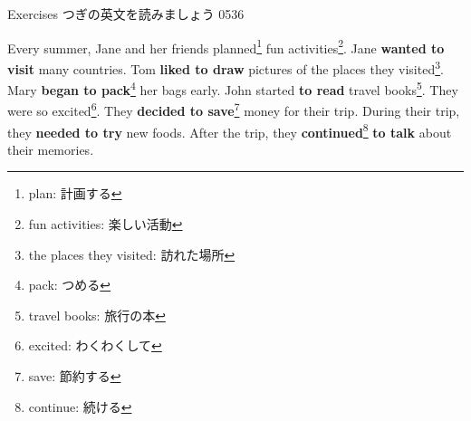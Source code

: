 \documentclass[aspectratio=169,xcolor={dvipsnames,table}]{beamer}
\begin{document}
\begin{frame}[plain]{Exercises}
つぎの英文を読みましょう%
\hfill{\tiny 0536}\,{\scriptsize {}}

Every summer, Jane and her friends planned\footnote{plan: 計画する} fun activities\footnote{fun activities: 楽しい活動}.
Jane {\bfseries wanted to visit} many countries.
Tom {\bfseries liked to draw} pictures of the places they visited\footnote{the places they visited: 訪れた場所}.
Mary {\bfseries began to pack}\footnote{pack: つめる} her bags early.
John started {\bfseries to read} travel books\footnote{travel books: 旅行の本}.
They were so excited\footnote{excited: わくわくして}.
They {\bfseries decided to save}\footnote{save: 節約する} money for their trip.
During their trip, they {\bfseries needed to try} new foods.
After the trip, they { \bfseries continued}\footnote{continue: 続ける} {\bfseries to talk} about their memories.
\end{frame}
\end{document}

